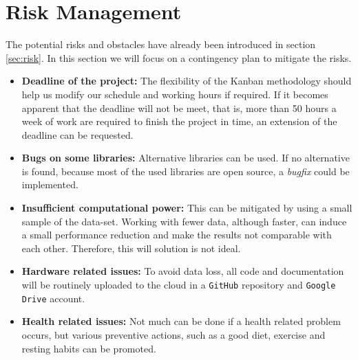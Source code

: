 \section{Risk Management}
\label{sec:risk_management}
The potential risks and obstacles have already been introduced in section \ref{sec:risk}. In this section we will focus on a contingency plan to mitigate the risks.

\begin{itemize}
    \item \textbf{Deadline of the project:} The flexibility of the Kanban methodology should help us modify our schedule and working hours if required. If it becomes apparent that the deadline will not be meet, that is, more than 50 hours a week of work are required to finish the project in time, an extension of the deadline can be requested.
    \item \textbf{Bugs on some libraries:} Alternative libraries can be used. If no alternative is found, because most of the used libraries are open source, a \emph{bugfix} could be implemented. 
    \item \textbf{Insufficient computational power:} This can be mitigated by using a small sample of the data-set. Working with fewer data, although faster, can induce a small performance reduction and make the results not comparable with each other. Therefore, this will solution is not ideal. 
    \item \textbf{Hardware related issues:} To avoid data loss, all code and documentation will be routinely uploaded to the cloud in a \texttt{GitHub} repository and \texttt{Google Drive} account.
    \item \textbf{Health related issues:} Not much can be done if a health related problem occurs, but various preventive actions, such as a good diet, exercise and resting habits can be promoted.
\end{itemize}




